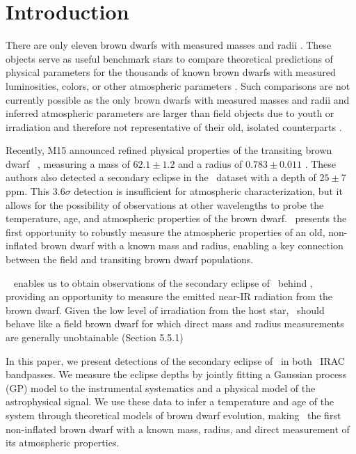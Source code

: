 

\section{Introduction}
\label{sec:intro-5}

There are only
eleven brown dwarfs with measured 
masses and radii \citep[hereafter M15, and references therein]{Montet15a}.
These objects serve as useful benchmark stars to compare theoretical 
predictions of physical parameters for the thousands of known brown dwarfs with
measured luminosities, colors, or other atmospheric parameters 
\citep{Faherty13, Mace13, Helling14}.
Such comparisons are not currently possible as the only brown dwarfs with measured
masses and radii and inferred atmospheric parameters are larger than field objects 
due to youth or irradiation
and therefore not representative of their old, isolated counterparts 
\citep{Stassun06, Siverd12}.


Recently, M15 announced refined physical properties of the transiting
brown dwarf \LC\ \citep{Johnson11a}, measuring a mass of $62.1 \pm 1.2$ \mjup{} and a radius of 
$0.783 \pm 0.011$ \rjup. These authors also detected a secondary eclipse in the
\itk\ dataset with a depth of $25 \pm 7$ ppm.
This $3.6 \sigma$ detection is insufficient for atmospheric characterization,
but it allows for the possibility of observations at other 
wavelengths to probe the temperature, age, and atmospheric properties of the 
brown dwarf.
\LC\ presents the first opportunity to robustly measure the
atmospheric properties of an old, non-inflated brown dwarf with a known mass
and radius, enabling a key connection between the field and transiting 
brown dwarf populations.


\spitz\ \citep{Werner04} enables us to obtain observations of the secondary eclipse of
\LC\ behind \LA, providing an opportunity to measure the emitted 
near-IR radiation from the brown dwarf. 
Given the low level of irradiation from the host star, \LC\ should behave 
like a field brown dwarf for which direct mass and radius measurements 
are generally unobtainable (Section 5.5.1)

In this paper, we present detections of the secondary eclipse of \LC\ in both
 \spitz\ IRAC bandpasses.
We measure the eclipse depths by jointly fitting a Gaussian process (GP) model
to the instrumental systematics and a physical model of the astrophysical
signal.
We use these data to infer a temperature and age of the system through 
theoretical models of brown dwarf evolution, making \LC\ the first 
non-inflated brown dwarf with a known mass, radius, and direct measurement
of its atmospheric properties. 


